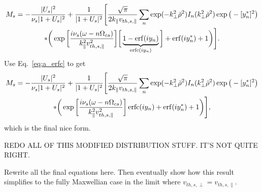 \begin{multline}
	M_s = -\frac{|U_s|^2}{\nu_s|1+U_s|^2} + \frac{1}{|1+U_s|^2} 
	\Bigg[ \frac{\sqrt{\pi}}{2 k_\parallel  v_{th,s,\parallel}}
	\sum_n \exp(-k_\perp^2\bar{\rho}^2) I_n(k_\perp^2\bar{\rho}^2)\exp\big( -[y_n^*]^2\big) 	\\
	* \bigg( \exp \bigg[ \frac{i\nu_s (\omega-n\Omega_{cs})}{k_\parallel^2v_{th,s,\parallel}^2} \bigg] 
	\bigg[\underbrace{1 - \operatorname{erf}(iy_n)}_{\operatorname{erfc}(i y_n)}  \bigg] +\operatorname{erf}(iy_n^*) + 1 \bigg)
	\Bigg].
\end{multline}
Use Eq.~\ref{eq:a_erfc} to get
\begin{multline}
	M_s = -\frac{|U_s|^2}{\nu_s|1+U_s|^2} + \frac{1}{|1+U_s|^2} 
	\Bigg[ \frac{\sqrt{\pi}}{2 k_\parallel v_{th,s,\parallel}}
	\sum_n \exp(-k_\perp^2\bar{\rho}^2) I_n(k_\perp^2\bar{\rho}^2)\exp\big( -[y_n^*]^2\big) 	\\
	* \bigg( \exp \bigg[ \frac{i\nu_s (\omega-n\Omega_{cs})}{k_\parallel^2v_{th,s,\parallel}^2} \bigg] 
	\operatorname{erfc}(i y_n)+\operatorname{erf}(iy_n^*) + 1 \bigg)
	\Bigg],
\end{multline}
which is the final nice form.  

REDO ALL OF THIS MODIFIED DISTRIBUTION STUFF. IT'S NOT QUITE RIGHT.

Rewrite all the final equations here. Then eventually show how this result simplifies to the fully Maxwellian case in the limit where $v_{th,s,\perp}=v_{th,s,\parallel}$.	